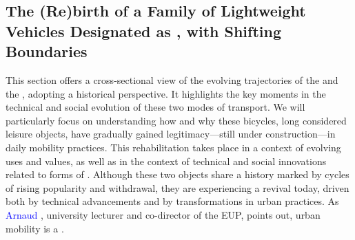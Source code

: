 \begin{refsegment}
\newpage
{} %
\section{The (Re)birth of a Family of Lightweight Vehicles Designated as , with Shifting Boundaries
    \label{chap1:mobilite-individuelle-legere}
    }

This section offers a cross-sectional view of the evolving trajectories of the  and the , adopting a historical perspective. It highlights the key moments in the technical and social evolution of these two modes of transport. We will particularly focus on understanding how and why these bicycles, long considered leisure objects, have gradually gained legitimacy—still under construction—in daily mobility practices. This rehabilitation takes place in a context of evolving uses and values, as well as in the context of technical and social innovations related to forms of  \textcolor{blue}{\autocite{barthelot_retro-innovation_2018}}. Although these two objects share a history marked by cycles of rising popularity and withdrawal, they are experiencing a revival today, driven both by technical advancements and by transformations in urban practices. As \textcolor{blue}{Arnaud} \textcolor{blue}{\textcite[26]{passalacqua_monde_2011}}, university lecturer and co-director of the \acrfull{EUP}, points out, urban mobility is a .%


\end{refsegment}
